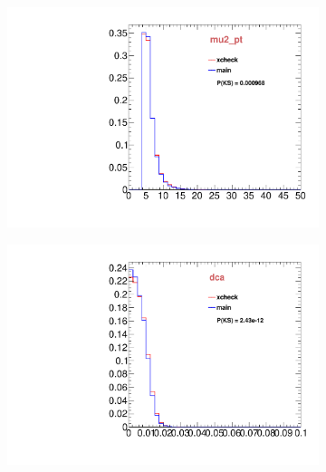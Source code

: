 \begin{figure}
\begin{subfigure}[b]{0.2\textwidth}
                \includegraphics[width=\textwidth]{Figures/VariablesComparison/Data_barrel_figs/m2pt}
                \label{fig:Data_barrel_m2pt}
        \end{subfigure}
        \begin{subfigure}[b]{0.2\textwidth}
                \centering
                \includegraphics[width=\textwidth]{Figures/VariablesComparison/Data_barrel_figs/maxdoca}
                \label{fig:Data_barrel_maxdoca}
        \end{subfigure}
        \begin{subfigure}[b]{0.2\textwidth}
                \centering

\end{subfigure}
\end{figure}
